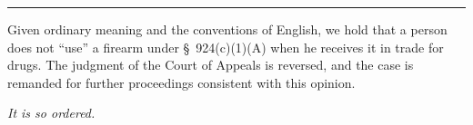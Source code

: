 \hrule

  Given ordinary meaning and the conventions of English, we hold that
a person does not ``use'' a firearm under \S~924(c)(1)(A) when he
receives it in trade for drugs. The judgment of the Court of Appeals is
reversed, and the case is remanded for further proceedings consistent
with this opinion.

\begin{flushright}\emph{It is so ordered.}\end{flushright}
